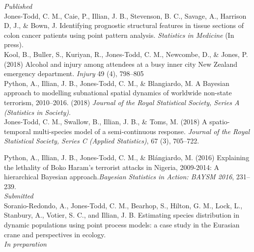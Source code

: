 \documentclass[10pt,a4paper]{moderncv}
\begin{document}
  \textit{\small{Published}}\\
  
\vspace{-3pt}
Jones-Todd, C. M., Caie, P., Illian, J. B., Stevenson, B. C., Savage, A., Harrison D, J., \& Bown, J. Identifying prognostic structural features in tissue sections of colon cancer patients using point pattern analysis. \textit{Statistics in Medicine} (In press).\\


\vspace{-3pt}
Kool, B., Buller, S., Kuriyan, R., Jones-Todd, C. M., Newcombe, D., \& Jones, P. (2018) Alcohol and injury among attendees at a busy inner city New Zealand emergency department. \textit{Injury} 49 (4), 798--805\\


\vspace{-3pt}
Python, A.,  Illian, J. B., Jones-Todd, C. M., \& Blangiardo, M. A Bayesian approach to modelling subnational spatial dynamics of worldwide non-state terrorism, 2010--2016. (2018) \textit{Journal of the Royal Statistical Society, Series  A (Statistics in Society)}.\\

  Jones-Todd, C. M., Swallow, B., Illian, J. B., \& Toms, M. (2018) A spatio-temporal multi-species model of a semi-continuous response. \textit{Journal of the Royal Statistical Society, Series C (Applied Statistics)}, 67 (3), 705--722.\\
\vspace{5pt}

\vspace{-3pt}
Python, A.,  Illian, J. B., Jones-Todd, C. M., \& Bl\'{a}ngiardo, M. (2016) Explaining the lethality of Boko Haram’s terrorist attacks in Nigeria, 2009-2014: A hierarchical Bayesian approach.\textit{Bayesian Statistics in Action: BAYSM 2016}, 231--239.\\


\textit{\small{Submitted}}\\

\vspace{-3pt}
Soranio-Redondo, A., Jones-Todd, C. M., Bearhop, S., Hilton, G. M., Lock, L., Stanbury, A., Votier, S. C., and Illian, J. B. Estimating species distribution in dynamic populations using point process models: a case study in the Eurasian crane and perspectives in ecology. \\


\textit{\small{In preparation}}\\
\end{document}

